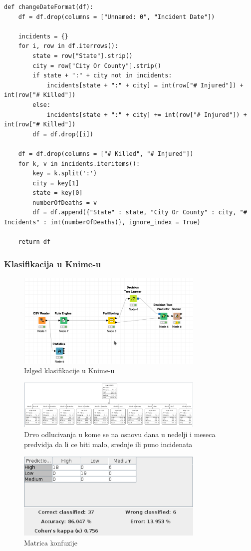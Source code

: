 \documentclass[11pt]{article} %
\begin{document}
	\begin{lstlisting}
def changeDateFormat(df):
	df = df.drop(columns = ["Unnamed: 0", "Incident Date"])
	
	incidents = {}
	for i, row in df.iterrows():
		state = row["State"].strip()
		city = row["City Or County"].strip()
		if state + ":" + city not in incidents:
			incidents[state + ":" + city] = int(row["# Injured"]) + int(row["# Killed"])
		else:
			incidents[state + ":" + city] += int(row["# Injured"]) + int(row["# Killed"])
		df = df.drop([i])
	
	df = df.drop(columns = ["# Killed", "# Injured"])
	for k, v in incidents.iteritems():
		key = k.split(':')
		city = key[1]
		state = key[0]
		numberOfDeaths = v
		df = df.append({"State" : state, "City Or County" : city, "# Incidents" : int(numberOfDeaths)}, ignore_index = True)
	
	return df
	\end{lstlisting}
	
	\subsubsection{Klasifikacija u Knime-u}
	
	\begin{figure}[h!]
        \includegraphics[width=0.8\textwidth]{klasifikacijaDanMesecKnime}
        \caption{Izlged klasifikacije u Knime-u}
	\end{figure}
	
	\begin{figure}[h!]
        \includegraphics[width=0.8\textwidth]{klasifikacijaDanMesec}
        \caption{Drvo odlucivanja u kome se na osnovu dana u nedelji i meseca predvidja da li ce biti malo, srednje ili puno incidenata}
	\end{figure}
	
	\begin{figure}[h!]
        \includegraphics[width=0.8\textwidth]{matricaKonfuzije}
        \caption{Matrica konfuzije}
	\end{figure}
	
\end{document}
